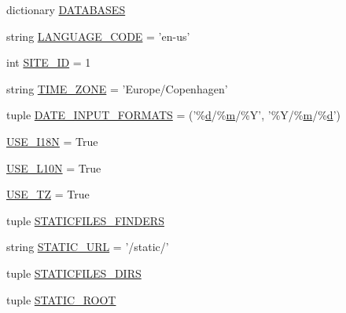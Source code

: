 \begin{DoxyCompactItemize}
\item 
dictionary \hyperlink{namespaceleapkit_1_1settings_1_1base__settings__local_acb55c116b89585e1223b543e2450f1d5}{D\-A\-T\-A\-B\-A\-S\-E\-S}
\item 
string \hyperlink{namespaceleapkit_1_1settings_1_1base__settings__local_a0314860518993338c5be5b350f74a063}{L\-A\-N\-G\-U\-A\-G\-E\-\_\-\-C\-O\-D\-E} = 'en-\/us'
\item 
int \hyperlink{namespaceleapkit_1_1settings_1_1base__settings__local_a1f0f2a98f3c1b476b390ec8c02894d64}{S\-I\-T\-E\-\_\-\-I\-D} = 1
\item 
string \hyperlink{namespaceleapkit_1_1settings_1_1base__settings__local_a6e1782a0358b1319d5e24b61f6041e91}{T\-I\-M\-E\-\_\-\-Z\-O\-N\-E} = 'Europe/Copenhagen'
\item 
tuple \hyperlink{namespaceleapkit_1_1settings_1_1base__settings__local_a1d32491749f9bb79d1dbf8b37b7c5d9c}{D\-A\-T\-E\-\_\-\-I\-N\-P\-U\-T\-\_\-\-F\-O\-R\-M\-A\-T\-S} = ('\%\hyperlink{static_2root_2js_2bootstrap_2bootstrap_8min_8js_aeb337d295abaddb5ec3cb34cc2e2bbc9}{d}/\%\hyperlink{jquery-migrate-1_82_81_8min_8js_a9e77e016b2928d7dcb493b89a0c9dc32}{m}/\%Y', '\%Y/\%\hyperlink{jquery-migrate-1_82_81_8min_8js_a9e77e016b2928d7dcb493b89a0c9dc32}{m}/\%\hyperlink{static_2root_2js_2bootstrap_2bootstrap_8min_8js_aeb337d295abaddb5ec3cb34cc2e2bbc9}{d}')
\item 
\hyperlink{namespaceleapkit_1_1settings_1_1base__settings__local_af730c74e39d1b9d481238bf8d1a82795}{U\-S\-E\-\_\-\-I18\-N} = True
\item 
\hyperlink{namespaceleapkit_1_1settings_1_1base__settings__local_ad34ae382a44c39751f33678d94986c2f}{U\-S\-E\-\_\-\-L10\-N} = True
\item 
\hyperlink{namespaceleapkit_1_1settings_1_1base__settings__local_a36d64f2bb90b969b53009fa20606c2b1}{U\-S\-E\-\_\-\-T\-Z} = True
\item 
tuple \hyperlink{namespaceleapkit_1_1settings_1_1base__settings__local_a205cb360c0af264fc6f364b5e3962b0e}{S\-T\-A\-T\-I\-C\-F\-I\-L\-E\-S\-\_\-\-F\-I\-N\-D\-E\-R\-S}
\item 
string \hyperlink{namespaceleapkit_1_1settings_1_1base__settings__local_aeacedb987014aaac1ec72f3fe7f3452f}{S\-T\-A\-T\-I\-C\-\_\-\-U\-R\-L} = '/static/'
\item 
tuple \hyperlink{namespaceleapkit_1_1settings_1_1base__settings__local_a25a7639ff92dd41708846c8e55cf0cbe}{S\-T\-A\-T\-I\-C\-F\-I\-L\-E\-S\-\_\-\-D\-I\-R\-S}
\item 
tuple \hyperlink{namespaceleapkit_1_1settings_1_1base__settings__local_ac98efde341432e0d850a5413a3637609}{S\-T\-A\-T\-I\-C\-\_\-\-R\-O\-O\-T}

\end{DoxyCompactItemize}
